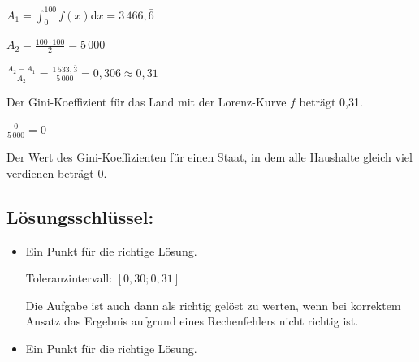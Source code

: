 \begin{langesbeispiel}
{\begin{enumerate}
		$A_1=\int^{100}_0{f(x)}$d$x=3\,466,\bar{6}$
		
		$A_2=\frac{100\cdot 100}{2}=5\,000$
		
		$\frac{A_2-A_1}{A_2}=\frac{1\,533,\bar{3}}{5\,000}=0,30\bar{6}\approx 0,31$
		
		Der Gini-Koeffizient für das Land mit der Lorenz-Kurve $f$ beträgt 0,31.\leer
		
		$\frac{0}{5\,000}=0$
		
		Der Wert des Gini-Koeffizienten für einen Staat, in dem alle Haushalte gleich viel verdienen beträgt 0.

	\subsection{Lösungsschlüssel:}
	
\begin{itemize}
	\item  Ein Punkt für die richtige Lösung.  
	
	Toleranzintervall: $[0,30; 0,31]$  
	
	Die Aufgabe ist auch dann als richtig gelöst zu werten, wenn bei korrektem Ansatz das Ergebnis aufgrund eines Rechenfehlers nicht richtig ist. 
	\item Ein Punkt für die richtige Lösung.
\end{itemize}

\end{enumerate}}
		\end{langesbeispiel}